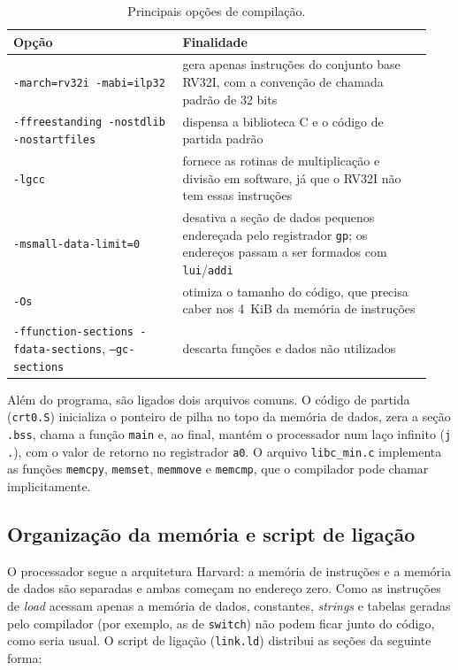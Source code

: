 \begin{table}[htbp]
  \centering
  \caption{Principais opções de compilação.}
  \label{tab:flags-gcc}
  \begin{tabular}{@{}p{0.38\linewidth}p{0.56\linewidth}@{}}
    \toprule
    Opção & Finalidade \\
    \midrule
    \texttt{-march=rv32i -mabi=ilp32} & gera apenas instruções do conjunto
      base RV32I, com a convenção de chamada padrão de 32 bits \\
    \texttt{-ffreestanding -nostdlib -nostartfiles} & dispensa a biblioteca
      C e o código de partida padrão \\
    \texttt{-lgcc} & fornece as rotinas de multiplicação e divisão em
      software, já que o RV32I não tem essas instruções \\
    \texttt{-msmall-data-limit=0} & desativa a seção de dados pequenos
      endereçada pelo registrador \texttt{gp}; os endereços passam a ser
      formados com \texttt{lui}/\texttt{addi} \\
    \texttt{-Os} & otimiza o tamanho do código, que precisa caber nos
      4~KiB da memória de instruções \\
    \texttt{-ffunction-sections -fdata-sections}, \texttt{--gc-sections} &
      descarta funções e dados não utilizados \\
    \bottomrule
  \end{tabular}
\end{table}

Além do programa, são ligados dois arquivos comuns. O código de partida
(\texttt{crt0.S}) inicializa o ponteiro de pilha no topo da memória de
dados, zera a seção \texttt{.bss}, chama a função \texttt{main} e, ao final,
mantém o processador num laço infinito (\texttt{j .}), com o valor de
retorno no registrador \texttt{a0}. O arquivo \texttt{libc\_min.c} implementa
as funções \texttt{memcpy}, \texttt{memset}, \texttt{memmove} e
\texttt{memcmp}, que o compilador pode chamar implicitamente.

\subsection{Organização da memória e script de ligação}

O processador segue a arquitetura Harvard: a memória de instruções e a
memória de dados são separadas e ambas começam no endereço zero. Como as
instruções de \textit{load} acessam apenas a memória de dados, constantes,
\textit{strings} e tabelas geradas pelo compilador (por exemplo, as de
\texttt{switch}) não podem ficar junto do código, como seria usual. O script
de ligação (\texttt{link.ld}) distribui as seções da seguinte forma:

